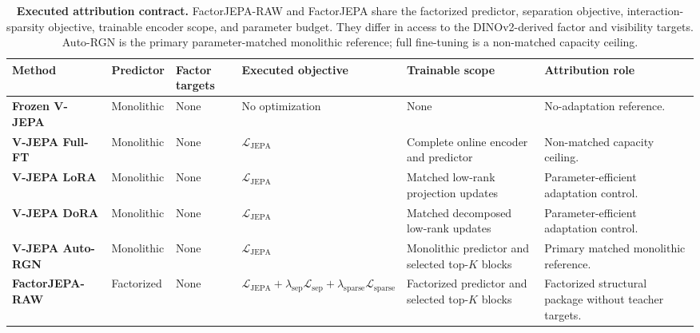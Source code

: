 \begin{table}[t]
\centering
\caption{
\textbf{Executed attribution contract.}
FactorJEPA-RAW and FactorJEPA share the factorized predictor,
separation objective, interaction-sparsity objective, trainable encoder
scope, and parameter budget. They differ in access to the
DINOv2-derived factor and visibility targets. Auto-RGN is the primary
parameter-matched monolithic reference; full fine-tuning is a
non-matched capacity ceiling.
}
\label{tab:executed_contract}
\scriptsize
\setlength{\tabcolsep}{4pt}
\renewcommand{\arraystretch}{1.15}

\begin{tabularx}{\textwidth}{
    p{}
    p{}
    p{}
    p{}
    p{}
    X
}
\toprule
\textbf{Method}
&
\textbf{Predictor}
&
\textbf{Factor targets}
&
\textbf{Executed objective}
&
\textbf{Trainable scope}
&
\textbf{Attribution role}
\\
\midrule

\rowcolor{AttrGray}
\textbf{Frozen V-JEPA}
&
Monolithic
&
None
&
No optimization
&
None
&
No-adaptation reference.
\\

\textbf{V-JEPA Full-FT}
&
Monolithic
&
None
&
\(\mathcal L_{\mathrm{JEPA}}\)
&
Complete online encoder and predictor
&
Non-matched capacity ceiling.
\\

\textbf{V-JEPA LoRA}
&
Monolithic
&
None
&
\(\mathcal L_{\mathrm{JEPA}}\)
&
Matched low-rank projection updates
&
Parameter-efficient adaptation control.
\\

\textbf{V-JEPA DoRA}
&
Monolithic
&
None
&
\(\mathcal L_{\mathrm{JEPA}}\)
&
Matched decomposed low-rank updates
&
Parameter-efficient adaptation control.
\\

\rowcolor{AttrBlue}
\textbf{V-JEPA Auto-RGN}
&
Monolithic
&
None
&
\(\mathcal L_{\mathrm{JEPA}}\)
&
Monolithic predictor and selected top-\(K\) blocks
&
Primary matched monolithic reference.
\\

\rowcolor{AttrGold}
\textbf{FactorJEPA-RAW}
&
Factorized
&
None
&
\(\mathcal L_{\mathrm{JEPA}}
+\lambda_{\mathrm{sep}}\mathcal L_{\mathrm{sep}}
+\lambda_{\mathrm{sparse}}\mathcal L_{\mathrm{sparse}}\)
&
Factorized predictor and selected top-\(K\) blocks
&
Factorized structural package without teacher targets.
\\


\end{tabularx}
\end{table}
